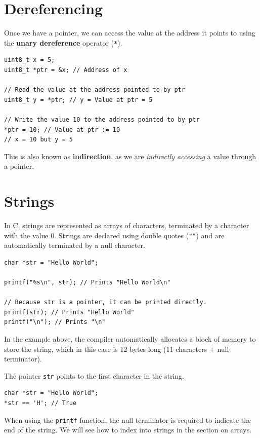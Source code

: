 \documentclass[a4paper]{report}
\begin{document}
\section{Dereferencing}
Once we have a pointer, we can access the value at the address it points to using the
\textbf{unary dereference} operator (\texttt{*}).
\begin{verbatim}
uint8_t x = 5;
uint8_t *ptr = &x; // Address of x

// Read the value at the address pointed to by ptr
uint8_t y = *ptr; // y = Value at ptr = 5

// Write the value 10 to the address pointed to by ptr
*ptr = 10; // Value at ptr := 10
// x = 10 but y = 5
\end{verbatim}
This is also known as \textbf{indirection}, as we are \textit{indirectly accessing} a value through a pointer.
\section{Strings}
In C, strings are represented as arrays of characters, terminated by a character with the value 0.
Strings are declared using double quotes (\texttt{""}) and are automatically terminated by a null character. %
\begin{verbatim}
char *str = "Hello World";

printf("%s\n", str); // Prints "Hello World\n"

// Because str is a pointer, it can be printed directly.
printf(str); // Prints "Hello World"
printf("\n"); // Prints "\n"
\end{verbatim}
In the example above, the compiler automatically allocates a block of memory to store the string,
which in this case is 12 bytes long (11 characters + null terminator).

The pointer \texttt{str} points to the first character in the string.
\begin{verbatim}
char *str = "Hello World";
*str == 'H'; // True
\end{verbatim}
When using the \texttt{printf} function, the null terminator is required to indicate the end of the string.
We will see how to index into strings in the section on arrays.
\end{document}

